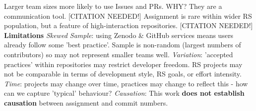 \documentclass[25pt, a0paper, landscape, margin=10mm, innermargin=15mm, blockverticalspace=15mm, subcolspace=8mm, dvipsnames]{tikzposter} %
\begin{document}
\begin{columns}
{{    %
    Larger team sizes more likely to use Issues and PRs. WHY? They are a communication tool. [CITATION NEEDED!] 
    Assignment is rare within wider RS population, but a feature of high-interaction repositories.
    [CITATION NEEDED!]     
    \newline
    \vspace*{0.4em} \newline
    \textbf{Limitations} \newline 
    \textit{Skewed Sample}: using Zenodo & GitHub services means users already follow some 'best practice'.  
    Sample is non-random (largest numbers of contributors) so may not represent smaller teams well. 
    \textit{Variation}: 'accepted practices' within repositories may restrict developer freedom. 
    RS projects may not be comparable in terms of development style, RS goals, or effort intensity.
    \textit{Time}: projects may change over time, practices may change to reflect this - how can we capture 'typical' behaviour?  
    \textit{Causation}: This work \textbf{does not establish causation} between assignment and commit numbers. 
    \newline
    }
}
\end{columns}
\end{document}
